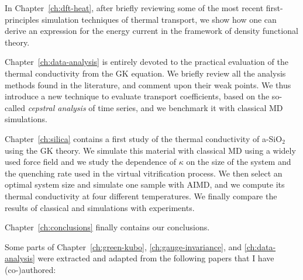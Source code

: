 \begin{LEtext}
In Chapter~\ref{ch:dft-heat}, after briefly reviewing some of the most recent first-principles simulation techniques of thermal transport, we show how one can derive an \abinitio expression for the energy current in the framework of density functional theory. 

Chapter~\ref{ch:data-analysis} is entirely devoted to the practical evaluation of the thermal conductivity from the GK equation. We briefly review all the analysis methods found in the literature, and comment upon their weak points. 
We thus introduce a new technique to evaluate transport coefficients, based on the so-called \emph{cepstral analysis} of time series, and we benchmark it with classical MD simulations.

Chapter~\ref{ch:silica} contains a first study of the thermal conductivity of a-SiO$_2$ using the \abinitio GK theory. 
We simulate this material with classical MD using a widely used force field and we study the dependence of $\kappa$ on the size of the system and the quenching rate used in the virtual vitrification process. 
We then select an optimal system size and simulate one sample with AIMD, and we compute its thermal conductivity at four different temperatures. We finally compare the results of classical and \abinitio simulations with experiments.

Chapter~\ref{ch:conclusions} finally contains our conclusions.

\smallskip
Some parts of Chapter~\ref{ch:green-kubo}, \ref{ch:gauge-invariance}, and \ref{ch:data-analysis} were extracted and adapted from the following papers that I have (co-)authored:




\end{LEtext}



